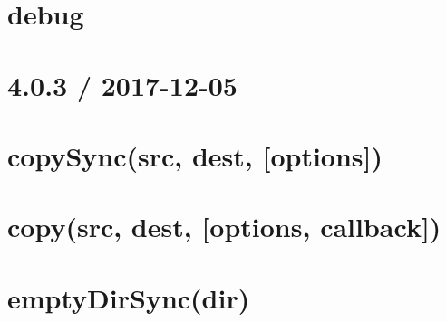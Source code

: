 \documentclass[twoside]{book}
\newcommand{\+}{\discretionary{\mbox{\scriptsize$\hookleftarrow$}}{}{}}
\begin{document}
\chapter{debug}
\label{md_dsmacc_vis_degree_node_modules_electron-packager_node_modules_electron-download_node_modules_debug_README}

\chapter{4.0.3 / 2017-\/12-\/05}
\label{md_dsmacc_vis_degree_node_modules_electron-packager_node_modules_electron-download_node_modules_fs-extra_CHANGELOG}

\chapter{copy\+Sync(src, dest, \mbox{[}options\mbox{]})}
\label{md_dsmacc_vis_degree_node_modules_electron-packager_node_modules_electron-download_node_modules_fs-extra_docs_copy-sync}

\chapter{copy(src, dest, \mbox{[}options, callback\mbox{]})}
\label{md_dsmacc_vis_degree_node_modules_electron-packager_node_modules_electron-download_node_modules_fs-extra_docs_copy}

\chapter{empty\+Dir\+Sync(dir)}
\label{md_dsmacc_vis_degree_node_modules_electron-packager_node_modules_electron-download_node_modules_fs-extra_docs_emptyDir-sync}

\end{document}
